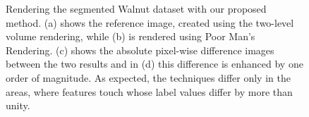 \documentclass{egpubl}
\begin{document}
\begin{figure}[p]
{		\label{fig:result2:pms}
	}
	\caption{Rendering the segmented Walnut dataset with our proposed method. (a) shows the reference image, created using the two-level volume rendering, while (b) is rendered using Poor Man's Rendering. (c) shows the absolute pixel-wise difference images between the two results and in (d) this difference is enhanced by one order of magnitude. As expected, the techniques differ only in the areas, where features touch whose label values differ by more than unity.}
	\label{fig:result2}
\end{figure}






\end{document}
